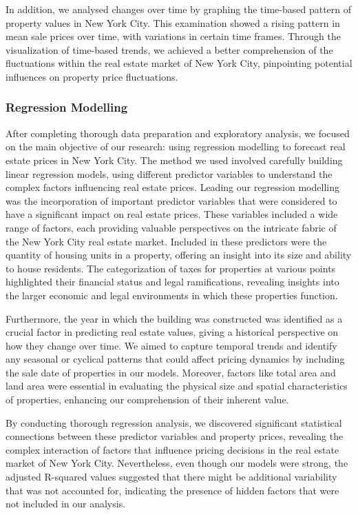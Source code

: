 \documentclass[
]{article}
\begin{document}
In addition, we analysed changes over time by graphing the time-based
pattern of property values in New York City. This examination showed a
rising pattern in mean sale prices over time, with variations in certain
time frames. Through the visualization of time-based trends, we achieved
a better comprehension of the fluctuations within the real estate market
of New York City, pinpointing potential influences on property price
fluctuations.

\hypertarget{regression-modelling}{%
\subsubsection{Regression Modelling}\label{regression-modelling}}

After completing thorough data preparation and exploratory analysis, we
focused on the main objective of our research: using regression
modelling to forecast real estate prices in New York City. The method we
used involved carefully building linear regression models, using
different predictor variables to understand the complex factors
influencing real estate prices. Leading our regression modelling was the
incorporation of important predictor variables that were considered to
have a significant impact on real estate prices. These variables
included a wide range of factors, each providing valuable perspectives
on the intricate fabric of the New York City real estate market.
Included in these predictors were the quantity of housing units in a
property, offering an insight into its size and ability to house
residents. The categorization of taxes for properties at various points
highlighted their financial status and legal ramifications, revealing
insights into the larger economic and legal environments in which these
properties function.

Furthermore, the year in which the building was constructed was
identified as a crucial factor in predicting real estate values, giving
a historical perspective on how they change over time. We aimed to
capture temporal trends and identify any seasonal or cyclical patterns
that could affect pricing dynamics by including the sale date of
properties in our models. Moreover, factors like total area and land
area were essential in evaluating the physical size and spatial
characteristics of properties, enhancing our comprehension of their
inherent value.

By conducting thorough regression analysis, we discovered significant
statistical connections between these predictor variables and property
prices, revealing the complex interaction of factors that influence
pricing decisions in the real estate market of New York City.
Nevertheless, even though our models were strong, the adjusted R-squared
values suggested that there might be additional variability that was not
accounted for, indicating the presence of hidden factors that were not
included in our analysis.
\end{document}
